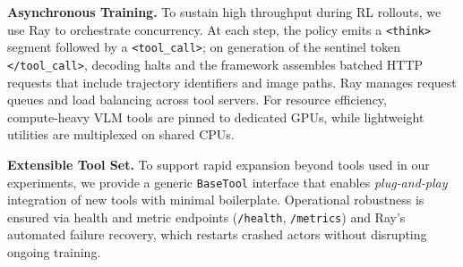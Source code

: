 \noindent \textbf{Asynchronous Training.}
To sustain high throughput during RL rollouts, we use Ray to orchestrate concurrency. At each step, the policy emits a \texttt{<think>} segment followed by a \texttt{<tool\_call>}; on generation of the sentinel token \texttt{</tool\_call>}, decoding halts and the framework assembles batched HTTP requests that include trajectory identifiers and image paths. Ray manages request queues and load balancing across tool servers. For resource efficiency, compute‑heavy VLM tools are pinned to dedicated GPUs, while lightweight utilities are multiplexed on shared CPUs.  


\noindent \textbf{Extensible Tool Set.}
To support rapid expansion beyond tools used in our experiments, we provide a generic \texttt{BaseTool} interface that enables \emph{plug‑and‑play} integration of new tools with minimal boilerplate.
Operational robustness is ensured via health and metric endpoints (\texttt{/health}, \texttt{/metrics}) and Ray's automated failure recovery, which restarts crashed actors without disrupting ongoing training.


